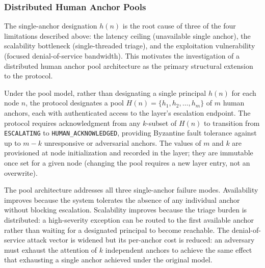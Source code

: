 \subsubsection{Distributed Human Anchor Pools}
\label{sec:fw:anchor-pools}

The single-anchor designation $h(n)$ is the root cause of three of the four limitations described above: the latency ceiling (unavailable single anchor), the scalability bottleneck (single-threaded triage), and the exploitation vulnerability (focused denial-of-service bandwidth). This motivates the investigation of a distributed human anchor pool architecture as the primary structural extension to the protocol.

Under the pool model, rather than designating a single principal $h(n)$ for each node $n$, the protocol designates a pool $H(n) = \{h_1, h_2, \ldots, h_m\}$ of $m$ human anchors, each with authenticated access to the \fact{} layer's escalation endpoint. The protocol requires acknowledgment from any $k$-subset of $H(n)$ to transition from \texttt{ESCALATING} to \texttt{HUMAN\_ACKNOWLEDGED}, providing Byzantine fault tolerance against up to $m - k$ unresponsive or adversarial anchors. The values of $m$ and $k$ are provisioned at node initialization and recorded in the \fact{} layer; they are immutable once set for a given node (changing the pool requires a new \fact{} layer entry, not an overwrite).

The pool architecture addresses all three single-anchor failure modes. Availability improves because the system tolerates the absence of any individual anchor without blocking escalation. Scalability improves because the triage burden is distributed: a high-severity exception can be routed to the first available anchor rather than waiting for a designated principal to become reachable. The denial-of-service attack vector is widened but its per-anchor cost is reduced: an adversary must exhaust the attention of $k$ independent anchors to achieve the same effect that exhausting a single anchor achieved under the original model.

